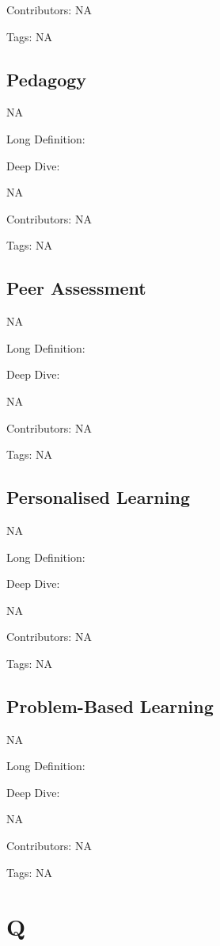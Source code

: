 \documentclass[
  letterpaper,
  DIV=11,
  numbers=noendperiod]{scrreprt}
\begin{document}
Contributors: NA

Tags: NA

\section{Pedagogy}\label{pedagogy}

NA

Long Definition:

Deep Dive:

NA

Contributors: NA

Tags: NA

\section{Peer Assessment}\label{peer-assessment}

NA

Long Definition:

Deep Dive:

NA

Contributors: NA

Tags: NA

\section{Personalised Learning}\label{personalised-learning}

NA

Long Definition:

Deep Dive:

NA

Contributors: NA

Tags: NA

\section{Problem-Based Learning}\label{problem-based-learning}

NA

Long Definition:

Deep Dive:

NA

Contributors: NA

Tags: NA


\chapter{Q}\label{q}
\end{document}
